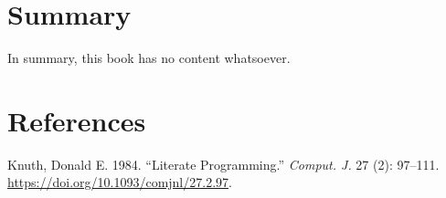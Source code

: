 \documentclass[
  letterpaper,
  DIV=11,
  numbers=noendperiod]{scrreprt}
\newlength{\cslhangindent}
\newenvironment{CSLReferences}[2] %
 {\begin{list}{}{%
  \setlength{\itemindent}{0pt}
  \setlength{\leftmargin}{0pt}
  \setlength{\parsep}{0pt}
  \ifodd #1
   \setlength{\leftmargin}{\cslhangindent}
   \setlength{\itemindent}{-1\cslhangindent}
  \fi
  \setlength{\itemsep}{#2\baselineskip}}}
 {\end{list}}
\begin{document}
\chapter{Summary}\label{summary-3}

In summary, this book has no content whatsoever.


\chapter*{References}\label{references-2}


\label{refs}
\begin{CSLReferences}{1}{0}
Knuth, Donald E. 1984. {``Literate Programming.''} \emph{Comput. J.} 27
(2): 97--111. \url{https://doi.org/10.1093/comjnl/27.2.97}.

\end{CSLReferences}
\end{document}
